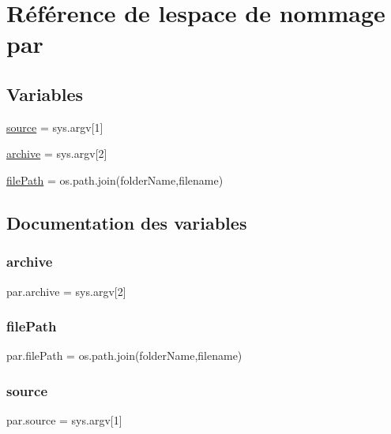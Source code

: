 \hypertarget{namespacepar}{}\section{Référence de l\textquotesingle{}espace de nommage par}
\label{namespacepar}
\subsection*{Variables}
\begin{DoxyCompactItemize}
\item 
\hyperlink{namespacepar_a3c7a829c4d39e0f8cd49caef26e87ee5}{source} = sys.\+argv\mbox{[}1\mbox{]}
\item 
\hyperlink{namespacepar_a7994069c6b9b1d24521bb194b366d7f8}{archive} = sys.\+argv\mbox{[}2\mbox{]}
\item 
\hyperlink{namespacepar_a98aa5fcf1c0865630ea3449850039b8b}{file\+Path} = os.\+path.\+join(folder\+Name,filename)
\end{DoxyCompactItemize}


\subsection{Documentation des variables}
\mbox{\label{namespacepar_a7994069c6b9b1d24521bb194b366d7f8}} 
\subsubsection{\texorpdfstring{archive}{archive}}
{\footnotesize\ttfamily par.\+archive = sys.\+argv\mbox{[}2\mbox{]}}

\mbox{\label{namespacepar_a98aa5fcf1c0865630ea3449850039b8b}} 
\subsubsection{\texorpdfstring{file\+Path}{filePath}}
{\footnotesize\ttfamily par.\+file\+Path = os.\+path.\+join(folder\+Name,filename)}

\mbox{\label{namespacepar_a3c7a829c4d39e0f8cd49caef26e87ee5}} 
\subsubsection{\texorpdfstring{source}{source}}
{\footnotesize\ttfamily par.\+source = sys.\+argv\mbox{[}1\mbox{]}}

